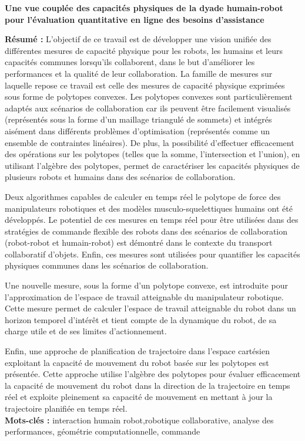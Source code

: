\documentclass[french,12pt,a4paper]{report}
\begin{document}
\thispagestyle{empty}
\vspace*{0pt}
\vfill
\begin{small}
\begin{center}
\textbf{Une vue couplée des capacités physiques de la dyade humain-robot pour l'évaluation quantitative en ligne des besoins d'assistance}
\end{center}    
\textbf{Résumé :} 
L'objectif de ce travail est de développer une vision unifiée des différentes mesures de capacité physique pour les robots, les humains et leurs capacités communes lorsqu'ils collaborent, dans le but d'améliorer les performances et la qualité de leur collaboration. La famille de mesures sur laquelle repose ce travail est celle des mesures de capacité physique exprimées sous forme de polytopes convexes. Les polytopes convexes sont particulièrement adaptés aux scénarios de collaboration car ils peuvent être facilement visualisés (représentés sous la forme d'un maillage triangulé de sommets) et intégrés aisément dans différents problèmes d'optimisation (représentés comme un ensemble de contraintes linéaires). De plus, la possibilité d'effectuer efficacement des opérations sur les polytopes (telles que la somme, l'intersection et l'union), en utilisant l'algèbre des polytopes, permet de caractériser les capacités physiques de plusieurs robots et humains dans des scénarios de collaboration.

Deux algorithmes capables de calculer en temps réel le polytope de force des manipulateurs robotiques et des modèles musculo-squelettiques humains ont été développés. Le potentiel de ces mesures en temps réel pour être utilisées dans des stratégies de commande flexible des robots dans des scénarios de collaboration (robot-robot et humain-robot) est démontré dans le contexte du transport collaboratif d'objets. Enfin, ces mesures sont utilisées pour quantifier les capacités physiques communes dans les scénarios de collaboration.

Une nouvelle mesure, sous la forme d'un polytope convexe, est introduite pour l'approximation de l'espace de travail atteignable du manipulateur robotique. Cette mesure permet de calculer l'espace de travail atteignable du robot dans un horizon temporel d'intérêt et tient compte de la dynamique du robot, de sa charge utile et de ses limites d'actionnement.

Enfin, une approche de planification de trajectoire dans l'espace cartésien exploitant la capacité de mouvement du robot basée sur les polytopes est présentée. Cette approche utilise l'algèbre des polytopes pour évaluer efficacement la capacité de mouvement du robot dans la direction de la trajectoire en temps réel et exploite pleinement sa capacité de mouvement en mettant à jour la trajectoire planifiée en temps réel.\\
\textbf{Mots-clés :} interaction humain robot,robotique collaborative, analyse des performances, géométrie computationnelle, commande\\
\noindent\makebox[\linewidth]{\rule{\textwidth}{0.4pt}}


\end{small}
\end{document}
